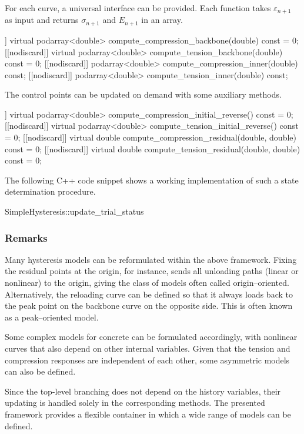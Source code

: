 For each curve, a universal interface can be provided.
Each function takes $\varepsilon_{n+1}$ as input and returns $\sigma_{n+1}$ and $E_{n+1}$ in an array.
\begin{cppcode}
	[[nodiscard]] virtual podarray<double> compute_compression_backbone(double) const = 0;
	[[nodiscard]] virtual podarray<double> compute_tension_backbone(double) const = 0;
	[[nodiscard]] podarray<double> compute_compression_inner(double) const;
	[[nodiscard]] podarray<double> compute_tension_inner(double) const;
\end{cppcode}
The control points can be updated on demand with some auxiliary methods.
\begin{cppcode}
	[[nodiscard]] virtual podarray<double> compute_compression_initial_reverse() const = 0;
	[[nodiscard]] virtual podarray<double> compute_tension_initial_reverse() const = 0;
	[[nodiscard]] virtual double compute_compression_residual(double, double) const = 0;
	[[nodiscard]] virtual double compute_tension_residual(double, double) const = 0;
\end{cppcode}

The following C++ code snippet shows a working implementation of such a state determination procedure.
\begin{cppcode}
SimpleHysteresis::update_trial_status
\end{cppcode}
\subsubsection{Remarks}
Many hysteresis models can be reformulated within the above framework.
Fixing the residual points at the origin, for instance, sends all unloading paths (linear or nonlinear) to the origin, giving the class of models often called origin--oriented.
Alternatively, the reloading curve can be defined so that it always loads back to the peak point on the backbone curve on the opposite side.
This is often known as a peak--oriented model.

Some complex models for concrete can be formulated accordingly, with nonlinear curves that also depend on other internal variables.
Given that the tension and compression responses are independent of each other, some asymmetric models can also be defined.

Since the top-level branching does not depend on the history variables, their updating is handled solely in the corresponding methods.
The presented framework provides a flexible container in which a wide range of models can be defined.

